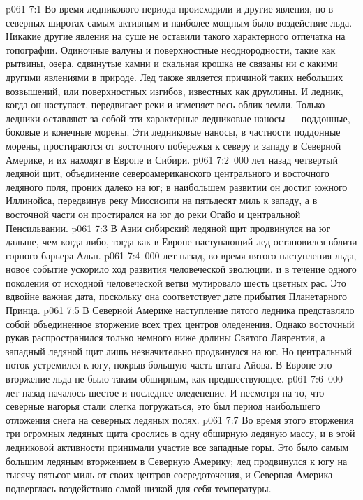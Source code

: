 \vs p061 7:1 Во время ледникового периода происходили и другие явления, но в северных широтах самым активным и наиболее мощным было воздействие льда. Никакие другие явления на суше не оставили такого характерного отпечатка на топографии. Одиночные валуны и поверхностные неоднородности, такие как рытвины, озера, сдвинутые камни и скальная крошка не связаны ни с какими другими явлениями в природе. Лед также является причиной таких небольших возвышений, или поверхностных изгибов, известных как друмлины. И ледник, когда он наступает, передвигает реки и изменяет весь облик земли. Только ледники оставляют за собой эти характерные ледниковые наносы --- поддонные, боковые и конечные морены. Эти ледниковые наносы, в частности поддонные морены, простираются от восточного побережья к северу и западу в Северной Америке, и их находят в Европе и Сибири.
\vs p061 7:2 \,000 лет назад четвертый ледяной щит, объединение североамериканского центрального и восточного ледяного поля, проник далеко на юг; в наибольшем развитии он достиг южного Иллинойса, передвинув реку Миссисипи на пятьдесят миль к западу, а в восточной части он простирался на юг до реки Огайо и центральной Пенсильвании.
\vs p061 7:3 В Азии сибирский ледяной щит продвинулся на юг дальше, чем когда\hyp{}либо, тогда как в Европе наступающий лед остановился вблизи горного барьера Альп.
\vs p061 7:4 \,000 лет назад, во время пятого наступления льда, новое событие ускорило ход развития человеческой эволюции.  и в течение одного поколения от исходной человеческой ветви мутировало шесть цветных рас. Это вдвойне важная дата, поскольку она соответствует дате прибытия Планетарного Принца.
\vs p061 7:5 В Северной Америке наступление пятого ледника представляло собой объединенное вторжение всех трех центров оледенения. Однако восточный рукав распространился только немного ниже долины Святого Лаврентия, а западный ледяной щит лишь незначительно продвинулся на юг. Но центральный поток устремился к югу, покрыв большую часть штата Айова. В Европе это вторжение льда не было таким обширным, как предшествующее.
\vs p061 7:6 \,000 лет назад началось шестое и последнее оледенение. И несмотря на то, что северные нагорья стали слегка погружаться, это был период наибольшего отложения снега на северных ледяных полях.
\vs p061 7:7 Во время этого вторжения три огромных ледяных щита срослись в одну обширную ледяную массу, и в этой ледниковой активности принимали участие все западные горы. Это было самым большим ледяным вторжением в Северную Америку; лед продвинулся к югу на тысячу пятьсот миль от своих центров сосредоточения, и Северная Америка подверглась воздействию самой низкой для себя температуры.
